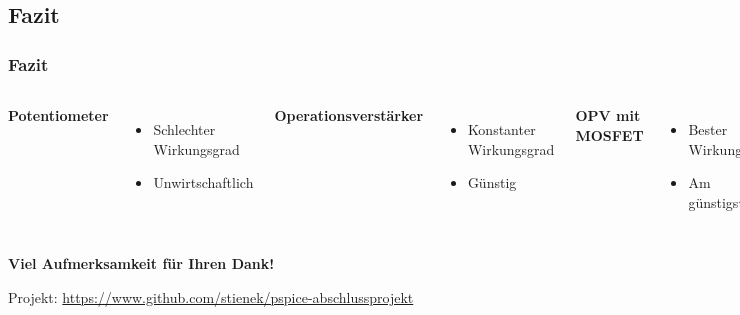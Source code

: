 \documentclass{beamer}
\begin{document}
	\subsection{Fazit}
	\begin{frame}
		\frametitle{Fazit}
		\begin{columns}
			\textbf{Potentiometer}
			\begin{itemize}
				\item{Schlechter Wirkungsgrad}
				\item{Unwirtschaftlich}
			\end{itemize}
			\textbf{Operationsverstärker}
			\begin{itemize}
				\item{Konstanter Wirkungsgrad}
				\item{Günstig}
			\end{itemize}
			\textbf{OPV mit MOSFET}
			\begin{itemize}
				\item{Bester Wirkungsgrad}
				\item{Am günstigsten}
			\end{itemize}
		\end{columns}
	\end{frame}
	\begin{frame}
		\begin{center}
			\textbf{\Huge Viel Aufmerksamkeit für Ihren Dank!}
			
			Projekt: \url{https://www.github.com/stienek/pspice-abschlussprojekt}
		\end{center}
	\end{frame}
\end{document}
